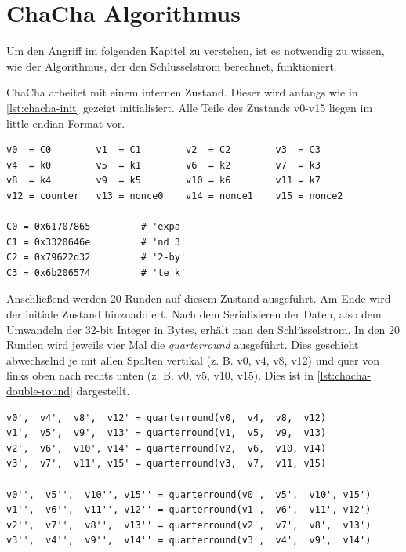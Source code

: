 \documentclass[a4paper,ngerman]{scrreprt}
\begin{document}
\section{ChaCha Algorithmus}

Um den Angriff im folgenden Kapitel zu verstehen, ist es notwendig zu wissen,
wie der Algorithmus, der den Schlüsselstrom berechnet, funktioniert.

ChaCha arbeitet mit einem internen Zustand. Dieser wird anfangs wie in
\autoref{lst:chacha-init} gezeigt initialisiert. Alle Teile des Zustands v0-v15
liegen im little-endian Format vor.

\begin{lstlisting}[caption={Initialer Zustand}, label=lst:chacha-init]
v0  = C0        v1  = C1        v2  = C2        v3  = C3
v4  = k0        v5  = k1        v6  = k2        v7  = k3
v8  = k4        v9  = k5        v10 = k6        v11 = k7
v12 = counter   v13 = nonce0    v14 = nonce1    v15 = nonce2

C0 = 0x61707865         # 'expa'
C1 = 0x3320646e         # 'nd 3'
C2 = 0x79622d32         # '2-by'
C3 = 0x6b206574         # 'te k'
\end{lstlisting}

\medskip

Anschließend werden 20 Runden auf diesem Zustand ausgeführt. Am Ende wird der
initiale Zustand hinzuaddiert. Nach dem Serialisieren der Daten, also dem
Umwandeln der 32-bit Integer in Bytes, erhält man den Schlüsselstrom. In den 20
Runden wird jeweils vier Mal die \emph{quarterround} ausgeführt. Dies geschieht
abwechselnd je mit allen Spalten vertikal (z. B. v0, v4, v8, v12) und quer von
links oben nach rechts unten (z. B. v0, v5, v10, v15). Dies ist in
\autoref{lst:chacha-double-round} dargestellt.

\begin{lstlisting}[caption={ChaCha Doppel-Runde}, label=lst:chacha-double-round]
v0',  v4',  v8',  v12' = quarterround(v0,  v4,  v8,  v12)
v1',  v5',  v9',  v13' = quarterround(v1,  v5,  v9,  v13)
v2',  v6',  v10', v14' = quarterround(v2,  v6,  v10, v14)
v3',  v7',  v11', v15' = quarterround(v3,  v7,  v11, v15)

v0'',  v5'',  v10'', v15'' = quarterround(v0',  v5',  v10', v15')
v1'',  v6'',  v11'', v12'' = quarterround(v1',  v6',  v11', v12')
v2'',  v7'',  v8'',  v13'' = quarterround(v2',  v7',  v8',  v13')
v3'',  v4'',  v9'',  v14'' = quarterround(v3',  v4',  v9',  v14')
\end{lstlisting}
\end{document}
